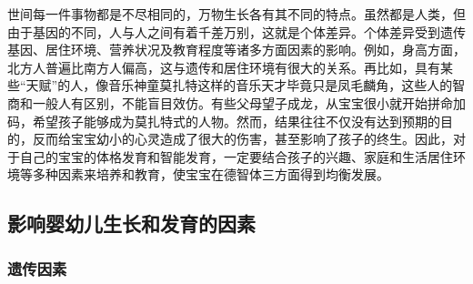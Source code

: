 世间每一件事物都是不尽相同的，万物生长各有其不同的特点。虽然都是人类，但由于基因的不同，人与人之间有着千差万别，这就是个体差异。个体差异受到遗传基因、居住环境、营养状况及教育程度等诸多方面因素的影响。例如，身高方面，北方人普遍比南方人偏高，这与遗传和居住环境有很大的关系。再比如，具有某些``天赋''的人，像音乐神童莫扎特这样的音乐天才毕竟只是凤毛麟角，这些人的智商和一般人有区别，不能盲目效仿。有些父母望子成龙，从宝宝很小就开始拼命加码，希望孩子能够成为莫扎特式的人物。然而，结果往往不仅没有达到预期的目的，反而给宝宝幼小的心灵造成了很大的伤害，甚至影响了孩子的终生。因此，对于自己的宝宝的体格发育和智能发育，一定要结合孩子的兴趣、家庭和生活居住环境等多种因素来培养和教育，使宝宝在德智体三方面得到均衡发展。








\subsection{影响婴幼儿生长和发育的因素}

\subsubsection{遗传因素}%


